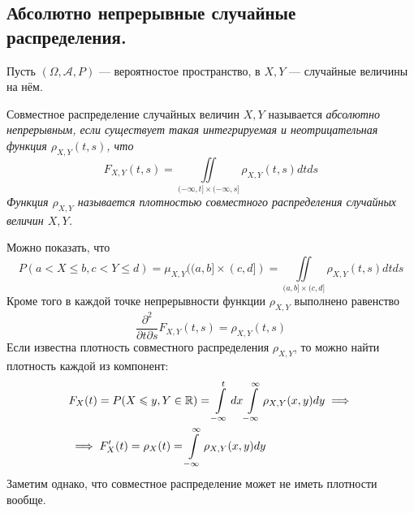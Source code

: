 \subsection{Абсолютно непрерывные случайные распределения.}
Пусть $(\Omega, \mathcal{A}, P)$ --- вероятностое пространство, в $X, Y$ --- случайные величины на нём.
\begin{definition}
    Совместное распределение случайных величин $X, Y$ называется \it{абсолютно непрерывным}, если существует
    такая интегрируемая и неотрицательная функция $\rho_{X, Y}(t, s)$, что
    \[
        F_{X, Y}(t, s) = \iint\limits_{(-\infty, t] \times (-\infty, s]} \rho_{X, Y}(t, s) dtds
    \]
    Функция $\rho_{X, Y}$ называется \it{плотностью} совместного распределения случайных величин $X, Y$.
\end{definition}
Можно показать, что
\[
    P(a < X \leq b, c < Y \leq d) = \mu_{X, Y}((a, b] \times (c, d]) =
    \iint\limits_{(a, b] \times (c, d]} \rho_{X, Y}(t, s) dtds
\]
Кроме того в каждой точке непрерывности функции $\rho_{X, Y}$ выполнено равенство
\[
    \frac{\partial^2}{\partial t\partial s} F_{X, Y}(t, s) = \rho_{X, Y}(t, s)
\]
Если известна плотность совместного распределения $\rho_{X, Y}$, то можно найти плотность каждой из компонент:
\begin{align*}
    &F_X(t) = P(X \leqslant y, Y \in \mathbb{R}) = \int\limits_{-\infty}^{t} dx \int\limits_{-\infty}^{\infty} \rho_{X, Y}(x, y) dy \implies\\
    &\implies F_X'(t) = \rho_X(t) = \int\limits_{-\infty}^{\infty} \rho_{X, Y}(x, y) dy
\end{align*}
Заметим однако, что совместное распределение может не иметь плотности вообще.

